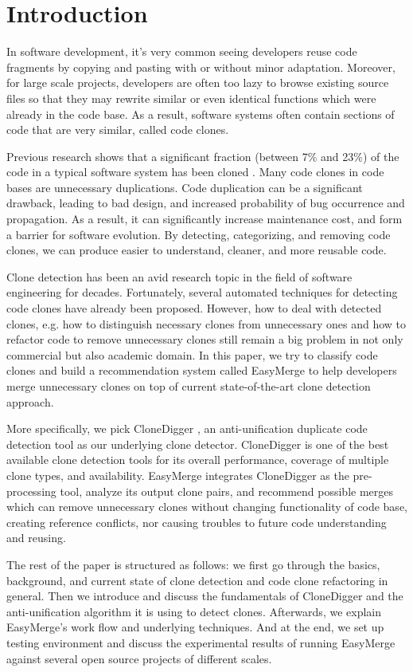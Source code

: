 \documentclass{acm_proc_article-sp}
\begin{document}
\section{Introduction}
In software development, it's very common seeing developers reuse code fragments by copying and pasting with or without minor adaptation.
Moreover, for large scale projects, developers are often too lazy to browse existing source files so that they may rewrite similar or even identical functions which
were already in the code base. As a result, software systems often contain sections of code that are very similar, called code clones.

Previous research shows that a significant fraction (between 7\% and 23\%) of the code in a typical software system has been cloned \cite{baker} \cite{roy1}. Many code clones
in code bases are unnecessary duplications. 
Code duplication can be a significant drawback, leading to bad design, and increased probability of bug occurrence and propagation. As a result, it can significantly
increase maintenance cost, and form a barrier for software evolution. By detecting, categorizing,
and removing code clones, we can produce easier to understand, cleaner, and more reusable code.

Clone detection has been an avid research topic in the field of software engineering for decades. Fortunately, several automated techniques for detecting code clones
have already been proposed. However, how to deal with detected clones, e.g. how to distinguish necessary clones from unnecessary ones and how to refactor code to remove
unnecessary clones still remain a big problem in not only commercial but also academic domain. In this paper, we try to classify code clones and build
a recommendation system called EasyMerge to help developers merge unnecessary clones on top of current state-of-the-art clone detection approach.

More specifically, we pick CloneDigger \cite{bulychev}, an anti-unification duplicate code detection tool as our underlying clone detector. CloneDigger is one of the best available 
clone detection tools for its overall performance, coverage of multiple clone types, and availability. 
EasyMerge integrates CloneDigger as the pre-processing tool, analyze its output clone pairs, and recommend possible merges which can remove unnecessary clones without changing functionality of code base, creating reference conflicts, nor causing troubles to future code understanding and reusing.

The rest of the paper is structured as follows: we first go through the basics, background, and current state of clone detection and code clone refactoring in general.
Then we introduce and discuss the fundamentals of CloneDigger and the anti-unification algorithm it is using to detect clones. Afterwards, we explain EasyMerge's
work flow and underlying techniques. And at the end, we set up testing environment and discuss the experimental results of running EasyMerge against several
open source projects of different scales.
\end{document}
